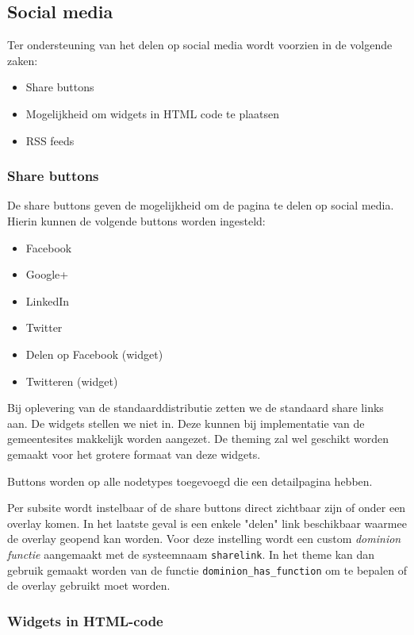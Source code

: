 \subsection{Social media}

Ter ondersteuning van het delen op social media wordt voorzien in de volgende zaken:
\begin{itemize}
\item Share buttons
\item Mogelijkheid om widgets in HTML code te plaatsen
\item RSS feeds
\end{itemize}

\subsubsection{Share buttons}

De share buttons geven de mogelijkheid om de pagina te delen op social media. Hierin kunnen de volgende buttons worden ingesteld:
\begin{itemize}
\item Facebook
\item Google+
\item LinkedIn
\item Twitter
\item Delen op Facebook (widget)
\item Twitteren (widget)
\end{itemize}

Bij oplevering van de standaarddistributie zetten we de standaard share links aan. De widgets stellen we niet in. Deze kunnen bij implementatie van de gemeentesites makkelijk worden aangezet. De theming zal wel geschikt worden gemaakt voor het grotere formaat van deze widgets.

Buttons worden op alle nodetypes toegevoegd die een detailpagina hebben.

Per subsite wordt instelbaar of de share buttons direct zichtbaar zijn of onder een overlay komen. In het laatste geval is een enkele "delen" link beschikbaar waarmee de overlay geopend kan worden. Voor deze instelling wordt een custom \emph{dominion functie} aangemaakt met de systeemnaam \texttt{sharelink}. In het theme kan dan gebruik gemaakt worden van de functie \texttt{dominion\_has\_function} om te bepalen of de overlay gebruikt moet worden.

\subsubsection{Widgets in HTML-code}

